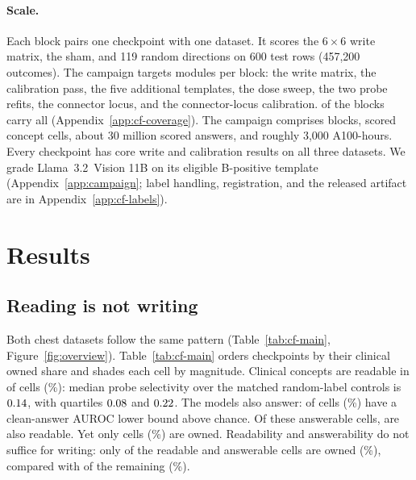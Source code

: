\documentclass{article}
\begin{document}
\paragraph{Scale.}
Each block pairs one checkpoint with one dataset. It scores the $6\times6$ write matrix, the sham, and 119 random directions on 600 test rows (457{,}200 outcomes). The campaign targets \cfCoveragePlannedWord{} modules per block: the write matrix, the calibration pass, the five additional templates, the dose sweep, the two probe refits, the connector locus, and the connector-locus calibration. \cfCoverageBlocksAllSeven{} of the \cfBlocks{} blocks carry all \cfCoveragePlannedWord{} (Appendix~\ref{app:cf-coverage}). The campaign comprises \cfBlocks{} blocks, \cfCells{} scored concept cells, about 30 million scored answers, and roughly 3{,}000 A100-hours. Every checkpoint has core write and calibration results on all three datasets. We grade Llama~3.2~Vision 11B on its eligible B-positive template (Appendix~\ref{app:campaign}; label handling, registration, and the released artifact are in Appendix~\ref{app:cf-labels}).
\section{Results}
\label{sec:results}

\subsection{Reading is not writing}
\label{sec:headline}

Both chest datasets follow the same pattern (Table~\ref{tab:cf-main}, Figure~\ref{fig:overview}). Table~\ref{tab:cf-main} orders checkpoints by their clinical owned share and shades each cell by magnitude. Clinical concepts are readable in \cfChestReadable{} of \cfChestReadableN{} cells (\cfChestReadablePct\%): median probe selectivity over the matched random-label controls is $0.14$, with quartiles $0.08$ and $0.22$. The models also answer: \cfChestAnswerable{} of \cfChestAnswerableN{} cells (\cfChestAnswerablePct\%) have a clean-answer AUROC lower bound above chance. Of these answerable cells, \cfReadAns{} are also readable. Yet only \cfChestOwned{} cells (\cfChestOwnedPct\%) are owned. Readability and answerability do not suffice for writing: only \cfReadAnsOwned{} of the \cfReadAns{} readable and answerable cells are owned (\cfReadAnsOwnedPct\%), compared with \cfRestOwned{} of the remaining \cfRestN{} (\cfRestOwnedPct\%).
\end{document}
